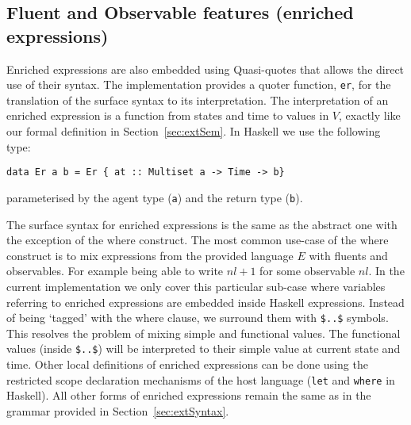 \documentclass[phd]{infthesis}
\begin{document}
\subsection{Fluent and Observable features (enriched expressions)}
Enriched expressions are also embedded using Quasi-quotes that allows the direct
use of their syntax. The implementation provides a quoter function, \texttt{er},
for the translation of the surface syntax to its interpretation. The
interpretation of an enriched expression is a function from states and time to
values in $V$, exactly like our formal definition in
Section~\ref{sec:extSem}. In Haskell we use the following type:
\begin{center}
  \texttt{data Er a b = Er \{ at :: Multiset a -> Time -> b\}}
\end{center} 
parameterised by the agent type (\texttt{a}) and the return type (\texttt{b}).

The surface syntax for enriched expressions is the same as the abstract one with
the exception of the $\mathrm{where}$ construct. The most common use-case of the
$\mathrm{where}$ construct is to mix expressions from the provided language $E$
with fluents and observables. For example being able to write $nl + 1$ for some
observable $nl$. In the current implementation we only cover this particular
sub-case where variables referring to enriched expressions are embedded inside
Haskell expressions. Instead of being `tagged' with the $\mathrm{where}$ clause,
we surround them with \texttt{\$..\$} symbols. This resolves the problem of
mixing simple and functional values. The functional values (inside
\texttt{\$..\$}) will be interpreted to their simple value at current state and
time. Other local definitions of enriched expressions can be done using the
restricted scope declaration mechanisms of the host language (\texttt{let} and
\texttt{where} in Haskell). All other forms of enriched expressions remain the
same as in the grammar provided in Section~\ref{sec:extSyntax}.
\end{document}
